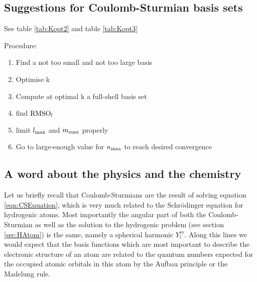 \subsection{Suggestions for Coulomb-Sturmian basis sets}



See table \vref{tab:Kopt2} and table \vref{tab:Kopt3} %








Procedure:
\begin{enumerate}
	\item Find a not too small and not too large basis
	\item Optimise k
	\item Compute at optimal k a full-shell basis set
	\item find $\text{RMSO}_l$
	\item limit $l_\text{max}$ and $m_\text{max}$ properly
	\item Go to large-enough value for $n_\text{max}$ to reach desired convergence
\end{enumerate}

\subsection{A word about the physics and the chemistry}
Let us briefly recall that Coulomb-Sturmians are the result of
solving equation \eqref{eqn:CSEquation},
which is very much related to the Schrödinger equation for hydrogenic atoms.
Most importantly the angular part of both the Coulomb-Sturmian
as well as the solution to the hydrogenic problem (see section \vref{sec:HAtom})
is the same, namely a spherical harmonic $Y_l^m$.
Along this lines we would expect that the \CS basis functions
which are most important to describe the electronic structure
of an atom are related to the quantum numbers expected
for the occupied atomic orbitals in this atom by the Aufbau principle
or the Madelung rule.



